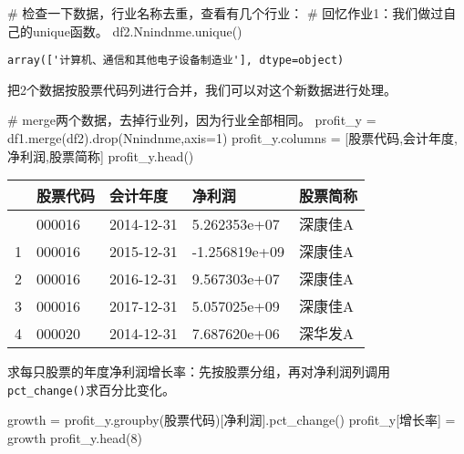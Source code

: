 \documentclass[
  letterpaper,
  DIV=11,
  numbers=noendperiod]{scrreprt}
\newenvironment{Shaded}{\begin{snugshade}}{\end{snugshade}}
\newcommand{\CommentTok}[1]{\textcolor[rgb]{0.37,0.37,0.37}{#1}}
\newcommand{\DecValTok}[1]{\textcolor[rgb]{0.68,0.00,0.00}{#1}}
\newcommand{\NormalTok}[1]{\textcolor[rgb]{0.00,0.23,0.31}{#1}}
\newcommand{\OperatorTok}[1]{\textcolor[rgb]{0.37,0.37,0.37}{#1}}
\newcommand{\StringTok}[1]{\textcolor[rgb]{0.13,0.47,0.30}{#1}}
\begin{document}
\begin{Shaded}
\begin{Highlighting}[]
\CommentTok{\# 检查一下数据，行业名称去重，查看有几个行业：}
\CommentTok{\# 回忆作业1：我们做过自己的unique函数。}
\NormalTok{df2.Nnindnme.unique()}
\end{Highlighting}
\end{Shaded}

\begin{verbatim}
array(['计算机、通信和其他电子设备制造业'], dtype=object)
\end{verbatim}

把2个数据按股票代码列进行合并，我们可以对这个新数据进行处理。

\begin{Shaded}
\begin{Highlighting}[]
\CommentTok{\# merge两个数据，去掉行业列，因为行业全部相同。}
\NormalTok{profit\_y }\OperatorTok{=}\NormalTok{ df1.merge(df2).drop(}\StringTok{\textquotesingle{}Nnindnme\textquotesingle{}}\NormalTok{,axis}\OperatorTok{=}\DecValTok{1}\NormalTok{)}
\NormalTok{profit\_y.columns }\OperatorTok{=}\NormalTok{ [}\StringTok{\textquotesingle{}股票代码\textquotesingle{}}\NormalTok{,}\StringTok{\textquotesingle{}会计年度\textquotesingle{}}\NormalTok{,}\StringTok{\textquotesingle{}净利润\textquotesingle{}}\NormalTok{,}\StringTok{\textquotesingle{}股票简称\textquotesingle{}}\NormalTok{]}
\NormalTok{profit\_y.head()}
\end{Highlighting}
\end{Shaded}

\begin{longtable}[]{@{}lllll@{}}
\toprule\noalign{}
& 股票代码 & 会计年度 & 净利润 & 股票简称 \\
\midrule\noalign{}
\endhead
\bottomrule\noalign{}
\endlastfoot
0 & 000016 & 2014-12-31 & 5.262353e+07 & 深康佳A \\
1 & 000016 & 2015-12-31 & -1.256819e+09 & 深康佳A \\
2 & 000016 & 2016-12-31 & 9.567303e+07 & 深康佳A \\
3 & 000016 & 2017-12-31 & 5.057025e+09 & 深康佳A \\
4 & 000020 & 2014-12-31 & 7.687620e+06 & 深华发A \\
\end{longtable}

求每只股票的年度净利润增长率：先按股票分组，再对净利润列调用\texttt{pct\_change()}求百分比变化。

\begin{Shaded}
\begin{Highlighting}[]
\NormalTok{growth }\OperatorTok{=}\NormalTok{ profit\_y.groupby(}\StringTok{\textquotesingle{}股票代码\textquotesingle{}}\NormalTok{)[}\StringTok{\textquotesingle{}净利润\textquotesingle{}}\NormalTok{].pct\_change()}
\NormalTok{profit\_y[}\StringTok{\textquotesingle{}增长率\textquotesingle{}}\NormalTok{] }\OperatorTok{=}\NormalTok{ growth}
\NormalTok{profit\_y.head(}\DecValTok{8}\NormalTok{)}
\end{Highlighting}
\end{Shaded}
\end{document}
